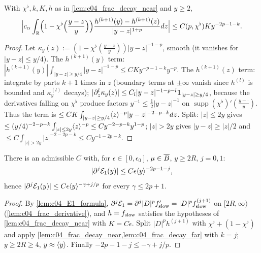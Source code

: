 \begin{lemma}
  \label{lem:c04_frac_decay_far}
  With $\chi^\flat,k,K,h$ as in \cref{lem:c04_frac_decay_near} and $y\ge2$,
  \[\Bigl|c_\alpha\int_{\mathbb{R}}\Bigl(1-\chi^\flat\Bigl(\frac{y-z}y\Bigr)\Bigr)\frac{h^{(k+1)}(y)-h^{(k+1)}(z)}{|y-z|^{1+p}}dz\Bigr|\le C(p,\chi^\flat)Ky^{-2p-1-k}.\]
\end{lemma}
\begin{proof}
  Let $\kappa_y(z):=(1-\chi^\flat(\frac{y-z}y))|y-z|^{-1-p}$, smooth (it vanishes for $|y-z|\le y/4$). The $h^{(k+1)}(y)$ term:
  $|h^{(k+1)}(y)|\int_{|y-z|\ge y/4}|y-z|^{-1-p}\le CKy^{-p-1-k}y^{-p}$. The $h^{(k+1)}(z)$ term: integrate by parts $k+1$ times in $z$ (boundary terms at
  $\pm\infty$ vanish since $h^{(l)}$ is bounded and $\kappa_y^{(l)}$ decays); $|\partial_z^l\kappa_y(z)|\le C_l|y-z|^{-1-p-l}\mathbf 1_{|y-z|\ge y/4}$, because the
  derivatives falling on $\chi^\flat$ produce factors $y^{-1}\le\frac12|y-z|^{-1}$ on $\operatorname{supp}(\chi^\flat)'(\frac{y-\cdot}y)$. Thus the term is
  $\le CK\int_{|y-z|\ge y/4}\langle z \rangle^{-p}|y-z|^{-2-p-k}dz$. Split: $|z|\le2y$ gives $\le(y/4)^{-2-p-k}\int_{|z|\le2y}\langle z \rangle^{-p}\le Cy^{-2-p-k}y^{1-p}$;
  $|z|>2y$ gives $|y-z|\ge|z|/2$ and $\le C\int_{|z|>2y}|z|^{-2-2p-k}\le Cy^{-1-2p-k}$.
\end{proof}

\begin{proposition}[Control of $\mc E_1$]
  \label{prop:approx_E1}
  There is an admissible $C$ with, for $\epsilon\in[0,\epsilon_0]$, $\mu\in\overline{B}$, $y\ge2R$, $j=0,1$:
  \begin{equation}\label{eqn:approx_E1_bound}
    |\partial^j\mathcal{E}_1(y)|\le C\epsilon\langle y \rangle^{-2p-1-j},
  \end{equation}
  hence $|\partial^j\mathcal{E}_1(y)|\le C\epsilon\langle y \rangle^{-\gamma+j/p}$ for every $\gamma\le2p+1$.
\end{proposition}
\begin{proof}
  By \cref{lem:c04_E1_formula}, $\partial^j\mathcal{E}_1=\partial^j|D|^pf_{\textup{slow}}'=|D|^pf_{\textup{slow}}^{(j+1)}$ on $[2R,\infty)$ (\cref{lem:c04_frac_derivative}), and
  $h=f_{\textup{slow}}$ satisfies the hypotheses of \cref{lem:c04_frac_decay_near} with $K=C\epsilon$. Split $|D|^ph^{(j+1)}$ with
  $\chi^\flat+(1-\chi^\flat)$ and apply \cref{lem:c04_frac_decay_near,lem:c04_frac_decay_far} with $k=j$; $y\ge2R\ge4$, $y\approx\langle y \rangle$. Finally
  $-2p-1-j\le-\gamma+j/p$.
\end{proof}

